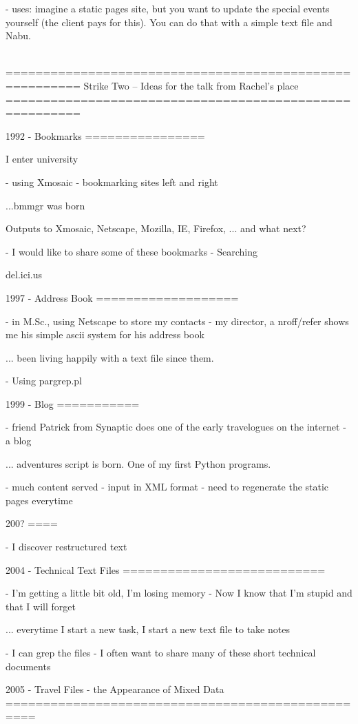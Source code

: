 - uses: imagine a static pages site, but you want to update the special events
  yourself (the client pays for this).  You can do that with a simple text file
  and Nabu.





========================================================
  Strike Two -- Ideas for the talk from Rachel's place
========================================================

1992 - Bookmarks
================

I enter university

- using Xmosaic
- bookmarking sites left and right

...bmmgr was born

Outputs to Xmosaic, Netscape, Mozilla, IE, Firefox, ... and what next?

- I would like to share some of these bookmarks
- Searching

del.ici.us


1997 - Address Book
===================

- in M.Sc., using Netscape to store my contacts
- my director, a nroff/refer shows me his simple ascii system for his address
  book

... been living happily with a text file since them.

- Using pargrep.pl


1999 - Blog
===========

- friend Patrick from Synaptic does one of the early travelogues on the internet
- a blog

... adventures script is born.  One of my first Python programs.

- much content served
- input in XML format
- need to regenerate the static pages everytime


200?
====

- I discover restructured text

2004 - Technical Text Files
===========================

- I'm getting a little bit old, I'm losing memory
- Now I know that I'm stupid and that I will forget

... everytime I start a new task, I start a new text file to take notes

- I can grep the files
- I often want to share many of these short technical documents



2005 - Travel Files - the Appearance of Mixed Data
==================================================

